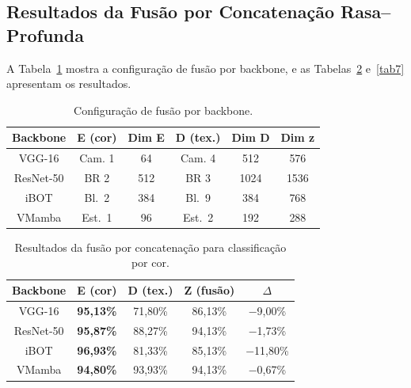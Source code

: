 \documentclass[conference]{IEEEtran}
\begin{document}
\subsection{Resultados da Fusão por Concatenação Rasa--Profunda}

A Tabela~\ref{tab5} mostra a configuração de fusão por backbone, e as
Tabelas~\ref{tab6} e~\ref{tab7} apresentam os resultados.

\begin{table}[htbp]
\caption{Configuração de fusão por backbone.}
\begin{center}
\begin{tabular}{c|c|c|c|c|c}
\hline
\textbf{Backbone} & \textbf{E (cor)} & \textbf{Dim E}
                  & \textbf{D (tex.)} & \textbf{Dim D} & \textbf{Dim z} \\
\hline
VGG-16    & Cam. 1  & 64  & Cam. 4  & 512  & 576  \\
ResNet-50 & BR 2    & 512 & BR 3    & 1024 & 1536 \\
iBOT      & Bl.\ 2  & 384 & Bl.\ 9  & 384  & 768  \\
VMamba    & Est.\ 1 & 96  & Est.\ 2 & 192  & 288  \\
\hline
\end{tabular}
\label{tab5}
\end{center}
\end{table}

\begin{table}[htbp]
\caption{Resultados da fusão por concatenação para classificação por cor.}
\begin{center}
\begin{tabular}{c|c|c|c|c}
\hline
\textbf{Backbone} & \textbf{E (cor)} & \textbf{D (tex.)}
                  & \textbf{Z (fusão)} & \textbf{$\Delta$} \\
\hline
VGG-16    & \textbf{95,13\%} & 71,80\% & 86,13\% & $-$9,00\%  \\
ResNet-50 & \textbf{95,87\%} & 88,27\% & 94,13\% & $-$1,73\%  \\
iBOT      & \textbf{96,93\%} & 81,33\% & 85,13\% & $-$11,80\% \\
VMamba    & \textbf{94,80\%} & 93,93\% & 94,13\% & $-$0,67\%  \\
\hline
\end{tabular}
\label{tab6}
\end{center}
\end{table}
\end{document}
